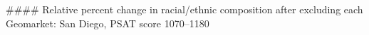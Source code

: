 #### Relative percent change in racial/ethnic composition after excluding each Geomarket: San Diego, PSAT score 1070–1180
